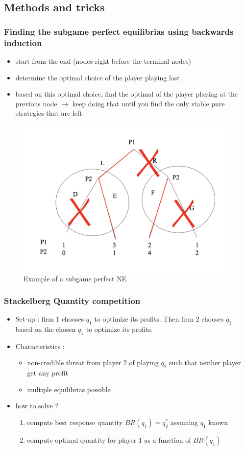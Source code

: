 \documentclass{article}
\begin{document}
\subsection{Methods and tricks }
\subsubsection{Finding the subgame perfect equilibrias using backwards induction}
\begin{itemize}
    \item start from the end (nodes right before the terminal nodes)
    \item determine the optimal choice of the player playing last
    \item based on this optimal choice, find the optimal of the player playing at the previous node $\rightarrow$ keep doing that until you find the only viable pure strategies that are left
\end{itemize}
\begin{figure}[htbp]
  \centering
\includegraphics[width=0.7\linewidth]{tree_subgame_perfect.png} %
  \caption{Example of a subgame perfect NE}
  \label{fig: Finding a subgame perfect NE}
\end{figure}

\subsubsection{Stackelberg Quantity competition}
\begin{itemize}
    \item  Set-up : firm 1 chooses $q_1$ to optimize its profits. Then firm 2 chooses $q_2$ based on the chosen $q_1$  to optimize its profits. 
    \item Characteristics : 
    \begin{itemize}
        \item non-credible threat from player 2 of playing $q_2$ such that neither player get any profit
        \item multiple equilibrias possible
    \end{itemize}
    \item how to solve ? 
    \begin{enumerate}
        \item compute best response quantity $BR(q_1) = q^*_2$ assuming $q_1$ known
        \item compute optimal quantity for player 1 as a function of $BR(q_1)$
    \end{enumerate}
\end{itemize}
\end{document}
